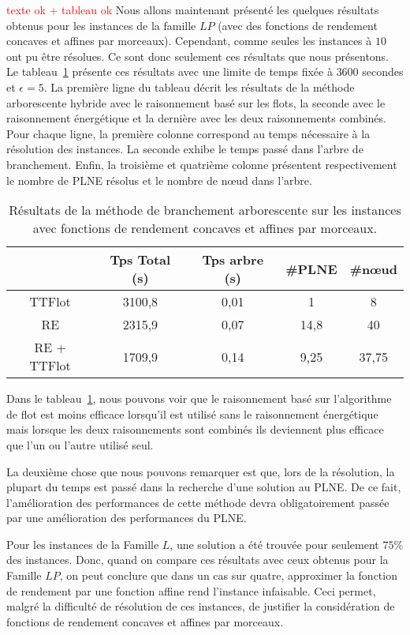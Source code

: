 \textcolor{red}{\LARGE texte ok + tableau ok}
Nous allons maintenant présenté les quelques résultats obtenus pour
les instances de la famille $LP$ (avec des fonctions de rendement
concaves et affines par morceaux). Cependant, comme seules les
instances à $10$ ont pu être résolues. Ce sont donc seulement ces
résultats que nous présentons. Le tableau~\ref{tab:BB_LPM} présente
ces résultats avec une limite de temps fixée à $3600$ secondes et
$\epsilon=5$. La première ligne du tableau décrit les résultats de la
méthode arborescente hybride avec le raisonnement basé sur les flots,
la seconde avec le raisonnement énergétique et la dernière avec les
deux raisonnements combinés. Pour chaque ligne, la première colonne
correspond au temps nécessaire à la résolution des instances. La
seconde exhibe le temps passé dans l'arbre de branchement. Enfin, la
troisième et quatrième colonne présentent respectivement le nombre de
PLNE résolus et le nombre de n\oe ud dans l'arbre.


\begin{table}[!htb]
\centering 
\begin{tabular}{|c|cccc|}
\hline
 & Tps Total (s)  & Tps arbre (s) & \#PLNE & \#n\oe ud\\
\hline
TTFlot &3100,8 &0,01&	1	& 8\\
RE&2315,9&0,07&	14,8	&40\\
RE + TTFlot &1709,9&	0,14&	9,25	&37,75\\
\hline
\end{tabular}
\caption{Résultats de la méthode de branchement arborescente sur les
  instances avec fonctions de rendement concaves et affines par
  morceaux. }
\label{tab:BB_LPM}
\end{table}

Dans le tableau~\ref{tab:BB_LPM}, nous pouvons voir que le
raisonnement basé sur l'algorithme de flot est moins efficace
lorsqu'il est utilisé sans le raisonnement énergétique mais lorsque
les deux raisonnements sont combinés ils deviennent plus efficace que
l'un ou l'autre utilisé seul. 

La deuxième chose que nous pouvons remarquer est que, lors de la
résolution, la plupart du temps est passé dans la recherche d'une
solution au PLNE. De ce fait, l'amélioration des performances de cette
méthode devra obligatoirement passée par une amélioration des
performances du PLNE. 

Pour les instances de la Famille $L$, une solution a été trouvée pour
seulement $75\%$ des instances. Donc, quand on compare ces résultats
avec ceux obtenus pour la Famille $LP$, on peut conclure que dans un
cas sur quatre, approximer la fonction de rendement par une fonction
affine rend l'instance infaisable. Ceci permet, malgré la difficulté
de résolution de ces instances, de justifier la considération de
fonctions de rendement concaves et affines par morceaux.





